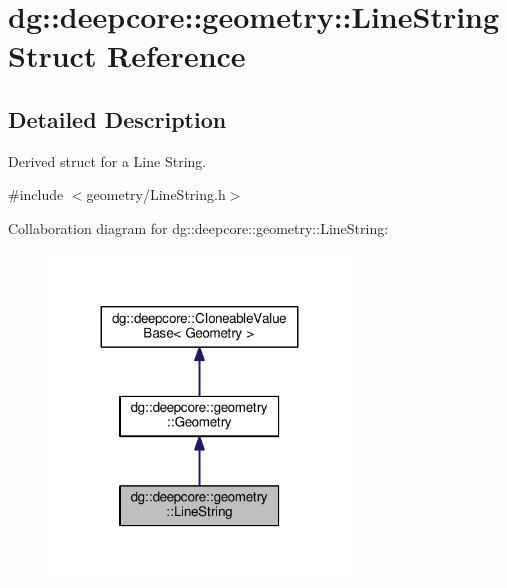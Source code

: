 \hypertarget{structdg_1_1deepcore_1_1geometry_1_1_line_string}{}\section{dg\+:\+:deepcore\+:\+:geometry\+:\+:Line\+String Struct Reference}
\label{structdg_1_1deepcore_1_1geometry_1_1_line_string}


\subsection{Detailed Description}
Derived struct for a Line String. 

{\ttfamily \#include $<$geometry/\+Line\+String.\+h$>$}



Collaboration diagram for dg\+:\+:deepcore\+:\+:geometry\+:\+:Line\+String\+:
\nopagebreak
\begin{figure}[H]
\begin{center}
\leavevmode
\includegraphics[width=227pt]{structdg_1_1deepcore_1_1geometry_1_1_line_string__coll__graph}
\end{center}
\end{figure}
